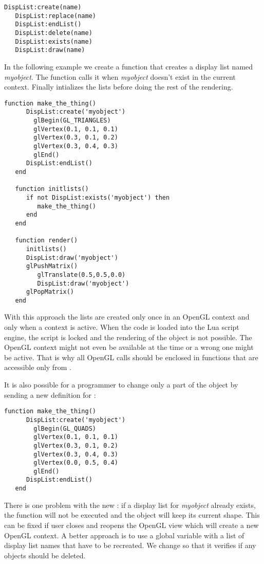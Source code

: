 \begin{Verbatim}[fontsize=\scriptsize,gobble=3]
   DispList:create(name)
   DispList:replace(name)
   DispList:endList()
   DispList:delete(name)
   DispList:exists(name)
   DispList:draw(name)
\end{Verbatim}

In the following example we create a function that creates a display list named
{\em myobject}. The function  calls it when {\em myobject}
doesn't exist in the current context. Finally  intializes the
lists before doing the rest of the rendering.

\begin{Verbatim}[fontsize=\scriptsize,gobble=3]
   function make_the_thing()
      DispList:create('myobject')
        glBegin(GL_TRIANGLES)
        glVertex(0.1, 0.1, 0.1)
        glVertex(0.3, 0.1, 0.2)
        glVertex(0.3, 0.4, 0.3)
        glEnd()
      DispList:endList()
   end

   function initlists()
      if not DispList:exists('myobject') then
         make_the_thing()
      end
   end

   function render()
      initlists()
      DispList:draw('myobject')
      glPushMatrix()
         glTranslate(0.5,0.5,0.0)
         DispList:draw('myobject')
      glPopMatrix()
   end
\end{Verbatim}

With this approach the lists are created only once in an OpenGL context and
only when a context is active.  When the code is loaded into the Lua script
engine, the script is locked and the rendering of the object is not possible.
The OpenGL context might not even be available at the time or a wrong one might
be active. That is why all OpenGL calls should be enclosed in functions that
are accessible only from .

It is also possible for a programmer to change only a part of the object by
sending a new definition for :

\begin{Verbatim}[fontsize=\scriptsize,gobble=3]
   function make_the_thing()
      DispList:create('myobject')
        glBegin(GL_QUADS)
        glVertex(0.1, 0.1, 0.1)
        glVertex(0.3, 0.1, 0.2)
        glVertex(0.3, 0.4, 0.3)
        glVertex(0.0, 0.5, 0.4)
        glEnd()
      DispList:endList()
   end
\end{Verbatim}

There is one problem with the new : if a display list
for {\em myobject} already exists, the function will not be executed and the
object will keep its current shape. This can be fixed if user closes and
reopens the OpenGL view which will create a new OpenGL context. A better
approach is to use a global variable with a list of display list names that
have to be recreated. We change  so that it verifies if any
objects should be deleted.


